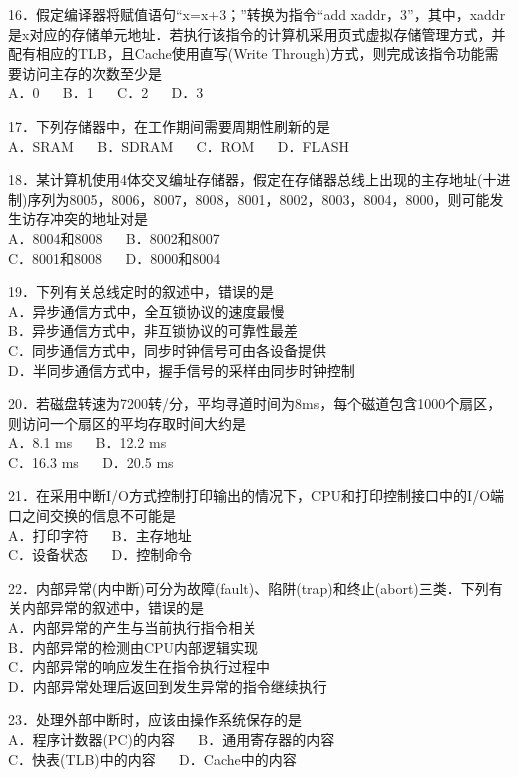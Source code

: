 16．假定编译器将赋值语句“x=x+3；”转换为指令“add xaddr，3”，其中，xaddr是x对应的存储单元地址．若执行该指令的计算机采用页式虚拟存储管理方式，并配有相应的TLB，且Cache使用直写(Write Through)方式，则完成该指令功能需要访问主存的次数至少是 \\
A．0 $\quad$ B．1 $\quad$ C．2 $\quad$ D．3

17．下列存储器中，在工作期间需要周期性刷新的是 \\
A．SRAM $\quad$ B．SDRAM $\quad$ C．ROM $\quad$ D．FLASH

18．某计算机使用4体交叉编址存储器，假定在存储器总线上出现的主存地址(十进制)序列为8005，8006，8007，8008，8001，8002，8003，8004，8000，则可能发生访存冲突的地址对是 \\
A．8004和8008 $\quad$ B．8002和8007 \\
C．8001和8008 $\quad$ D．8000和8004

19．下列有关总线定时的叙述中，错误的是 \\
A．异步通信方式中，全互锁协议的速度最慢 \\
B．异步通信方式中，非互锁协议的可靠性最差 \\
C．同步通信方式中，同步时钟信号可由各设备提供 \\
D．半同步通信方式中，握手信号的采样由同步时钟控制

20．若磁盘转速为7200转/分，平均寻道时间为8ms，每个磁道包含1000个扇区，则访问一个扇区的平均存取时间大约是 \\
A．8.1 ms $\quad$ B．12.2 ms \\
C．16.3 ms $\quad$ D．20.5 ms

21．在采用中断I/O方式控制打印输出的情况下，CPU和打印控制接口中的I/O端口之间交换的信息不可能是 \\
A．打印字符 $\quad$ B．主存地址 \\
C．设备状态 $\quad$ D．控制命令

22．内部异常(内中断)可分为故障(fault)、陷阱(trap)和终止(abort)三类．下列有关内部异常的叙述中，错误的是 \\
A．内部异常的产生与当前执行指令相关 \\
B．内部异常的检测由CPU内部逻辑实现 \\
C．内部异常的响应发生在指令执行过程中 \\
D．内部异常处理后返回到发生异常的指令继续执行

23．处理外部中断时，应该由操作系统保存的是 \\
A．程序计数器(PC)的内容 $\quad$ B．通用寄存器的内容 \\
C．快表(TLB)中的内容 $\quad$ D．Cache中的内容

